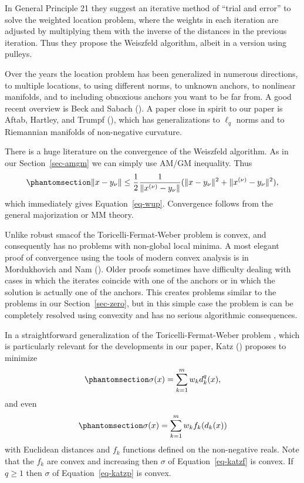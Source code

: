\documentclass[
  12pt,
  letterpaper,
  DIV=11,
  numbers=noendperiod]{scrartcl}
\theoremstyle{definition}
\theoremstyle{definition}
\theoremstyle{plain}
\theoremstyle{plain}
\theoremstyle{plain}
\theoremstyle{remark}
\begin{document}
In General Principle 21 they suggest an iterative method of ``trial and
error'' to solve the weighted location problem, where the weights in
each iteration are adjusted by multiplying them with the inverse of the
distances in the previous iteration. Thus they propose the Weiszfeld
algorithm, albeit in a version using pulleys.

Over the years the location problem has been generalized in numerous
directions, to multiple locations, to using different norms, to unknown
anchors, to nonlinear manifolds, and to including obnoxious anchors you
want to be far from. A good recent overview is Beck and Sabach
(). A paper close in spirit to our
paper is Aftab, Hartley, and Trumpf
(), which has
generalizations to \(\ell_q\) norms and to Riemannian manifolds of
non-negative curvature.

There is a huge literature on the convergence of the Weiszfeld
algorithm. As in our Section~\ref{sec-amgm} we can simply use AM/GM
inequality. Thus \begin{equation}\phantomsection\label{eq-webamgm}{
\|x-y_\nu\|\leq\frac12\frac{1}{\|x^{(\nu)}-y_\nu\|}(\|x-y_\nu\|^2+\|x^{(\nu)}-y_\nu\|^2),
}\end{equation} which immediately gives Equation~\ref{eq-wup}.
Convergence follows from the general majorization or MM theory.

Unlike robust smacof the Toricelli-Fermat-Weber problem is convex, and
consequently has no problems with non-global local minima. A most
elegant proof of convergence using the tools of modern convex analysis
is in Mordukhovich and Nam ().
Older proofs sometimes have difficulty dealing with cases in which the
iterates coincide with one of the anchors or in which the solution is
actually one of the anchors. This creates problems similar to the
problems in our Section~\ref{sec-zero}, but in this simple case the
problem is can be completely resolved using convexity and has no serious
algorithmic consequences.

In a straightforward generalization of the Toricelli-Fermat-Weber
problem , which is particularly relevant for the developments in our
paper, Katz () proposes to minimize
\begin{equation}\phantomsection\label{eq-katzp}{
\sigma(x)=\sum_{k=1}^mw_kd_k^q(x),
}\end{equation} and even
\begin{equation}\phantomsection\label{eq-katzf}{
\sigma(x)=\sum_{k=1}^mw_kf_k(d_k(x))
}\end{equation} with Euclidean distances and \(f_k\) functions defined
on the non-negative reals. Note that the \(f_k\) are convex and
increasing then \(\sigma\) of Equation~\ref{eq-katzf} is convex. If
\(q\geq 1\) then \(\sigma\) of Equation~\ref{eq-katzp} is convex.
\end{document}
